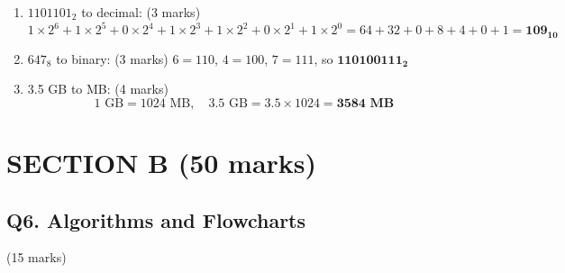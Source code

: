 \documentclass[12pt]{article}
\begin{document}
\begin{enumerate}[label=(\alph*)]
    \item $1101101_2$ to decimal: \hfill (3 marks)
    \[
    1\times2^6 + 1\times2^5 + 0\times2^4 + 1\times2^3 + 1\times2^2 + 0\times2^1 + 1\times2^0
    = 64 + 32 + 0 + 8 + 4 + 0 + 1 = \mathbf{109_{10}}
    \]

    \item $647_8$ to binary: \hfill (3 marks)
    $6 = 110$, $4 = 100$, $7 = 111$, so $\mathbf{110100111_2}$

    \item 3.5 GB to MB: \hfill (4 marks)
    \[
    1\text{ GB} = 1024\text{ MB}, \quad 3.5\text{ GB} = 3.5 \times 1024 = \mathbf{3584\text{ MB}}
    \]
\end{enumerate}

\newpage

\section*{SECTION B (50 marks)}

\subsection*{Q6. Algorithms and Flowcharts} \hfill (15 marks)
\end{document}

